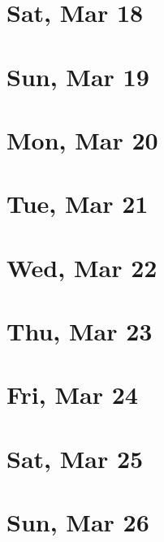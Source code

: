 	\section{Sat, Mar 18}
		
		
	\section{Sun, Mar 19}
		
		
	\section{Mon, Mar 20}
		
		
	\section{Tue, Mar 21}
		
		
	\section{Wed, Mar 22}
		
		
	\section{Thu, Mar 23}
		
		
	\section{Fri, Mar 24}
		
		
	\section{Sat, Mar 25}
		
		
	\section{Sun, Mar 26}
		
		
